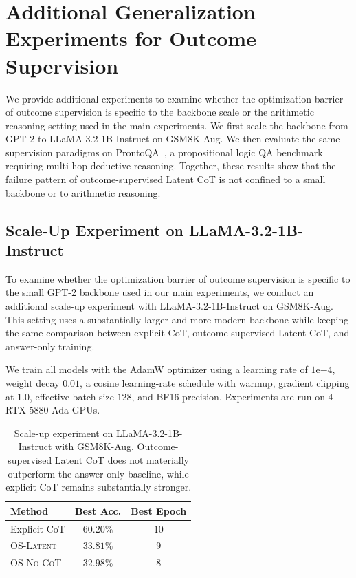 \section{Additional Generalization Experiments for Outcome Supervision}
\label{app:os_generalization}

We provide additional experiments to examine whether the optimization barrier of outcome supervision is specific to the backbone scale or the arithmetic reasoning setting used in the main experiments.
We first scale the backbone from GPT-2 to LLaMA-3.2-1B-Instruct on GSM8K-Aug.
We then evaluate the same supervision paradigms on ProntoQA~\citep{PrOntoQA}, a propositional logic QA benchmark requiring multi-hop deductive reasoning.
Together, these results show that the failure pattern of outcome-supervised Latent CoT is not confined to a small backbone or to arithmetic reasoning.

\subsection{Scale-Up Experiment on LLaMA-3.2-1B-Instruct}
\label{app:scale_up_os}

To examine whether the optimization barrier of outcome supervision is specific to the small GPT-2 backbone used in our main experiments, we conduct an additional scale-up experiment with LLaMA-3.2-1B-Instruct on GSM8K-Aug.
This setting uses a substantially larger and more modern backbone while keeping the same comparison between explicit CoT, outcome-supervised Latent CoT, and answer-only training.

We train all models with the AdamW optimizer using a learning rate of $1\mathrm{e}{-4}$, weight decay $0.01$, a cosine learning-rate schedule with warmup, gradient clipping at $1.0$, effective batch size $128$, and BF16 precision.
Experiments are run on $4$ RTX 5880 Ada GPUs.

\begin{table}[h]
\centering
\caption{Scale-up experiment on LLaMA-3.2-1B-Instruct with GSM8K-Aug. Outcome-supervised Latent CoT does not materially outperform the answer-only baseline, while explicit CoT remains substantially stronger.}
\label{tab:llama_scale_os}
\begin{tabular}{lcc}
\toprule
\textbf{Method} & \textbf{Best Acc.} & \textbf{Best Epoch} \\
\midrule
Explicit CoT & $60.20\%$ & $10$ \\
\textsc{OS-Latent} & $33.81\%$ & $9$ \\
\textsc{OS-No-CoT} & $32.98\%$ & $8$ \\
\bottomrule
\end{tabular}
\end{table}

